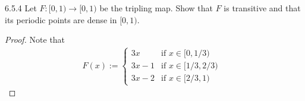 \begin{problem}{6.5.4}
  Let $F:[0,1) \to [0,1)$ be the tripling map. Show that $F$ is transitive
  and that its periodic points are dense in $[0, 1)$.
\end{problem}

\begin{proof}
  Note that
  \begin{align*}
    F(x):=
    \begin{cases}
      3x    & \text{if $x \in [0, 1/3)$ }\\
      3x -1 & \text{if $x \in [1/3, 2/3)$ }\\
      3x -2 & \text{if $x \in [2/3, 1)$ }
    \end{cases}
  \end{align*}
\end{proof}
\newpage
